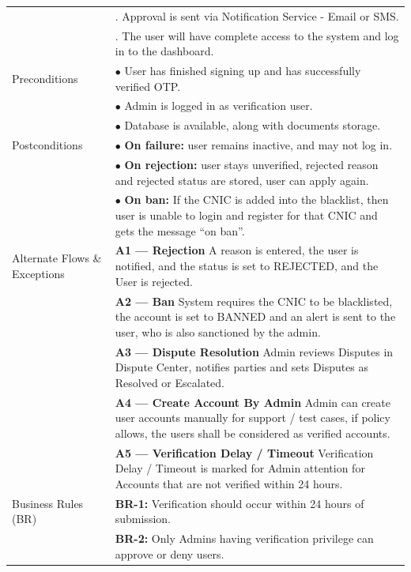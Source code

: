 \begin{longtable}{|>{\raggedright\arraybackslash}p{4cm}|>{\raggedright\arraybackslash}p{11cm}|}
& 7. Approval is sent via Notification Service - Email or SMS. \\
& 8. The user will have complete access to the system and log in to the dashboard. \\
\hline
Preconditions & $\bullet$ User has finished signing up and has successfully verified OTP. \\
& $\bullet$ Admin is logged in as verification user. \\
& $\bullet$ Database is available, along with documents storage. \\
\hline
Postconditions & $\bullet$ \textbf{On failure:} user remains inactive, and may not log in. \\
& $\bullet$ \textbf{On rejection:} user stays unverified, rejected reason and rejected status are stored, user can apply again. \\
& $\bullet$ \textbf{On ban:} If the CNIC is added into the blacklist, then user is unable to login and register for that CNIC and gets the message “on ban”. \\
\hline
Alternate Flows \& Exceptions & \textbf{A1 — Rejection} \newline A reason is entered, the user is notified, and the status is set to REJECTED, and the User is rejected. \\
& \textbf{A2 — Ban} \newline System requires the CNIC to be blacklisted, the account is set to BANNED and an alert is sent to the user, who is also sanctioned by the admin. \\
& \textbf{A3 — Dispute Resolution } \newline Admin reviews Disputes in Dispute Center, notifies parties and sets Disputes as Resolved or Escalated. \\
& \textbf{A4 — Create Account By Admin} \newline Admin can create user accounts manually for support / test cases, if policy allows, the users shall be considered as verified accounts. \\
& \textbf{A5 — Verification Delay / Timeout} \newline Verification Delay / Timeout is marked for Admin attention for Accounts that are not verified within 24 hours. \\
\hline
Business Rules (BR) & \textbf{BR-1:} Verification should occur within 24 hours of submission. \\
& \textbf{BR-2:} Only Admins having verification privilege can approve or deny users. \\

\end{longtable}
